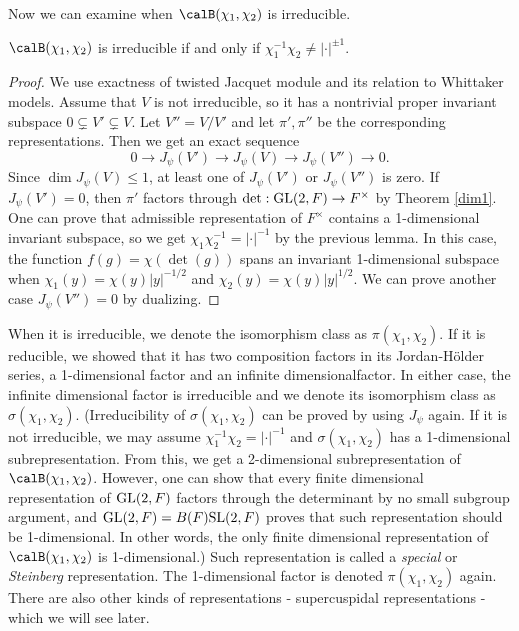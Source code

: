 Now we can examine when $\calB(\chi_1, \chi_2)$ is irreducible. 
\begin{theorem}
$\calB(\chi_1, \chi_2)$ is irreducible if and only if $\chi_1^{-1}\chi_2 \neq  |\cdot|^{\pm 1}$. 
\end{theorem}
\begin{proof}
We use exactness of twisted Jacquet module and its relation to Whittaker models. 
Assume that $V$ is not irreducible, so it has a nontrivial proper invariant subspace $0\subsetneq V'\subsetneq V$. 
Let $V'' = V/V'$ and let $\pi', \pi''$ be the corresponding representations. 
Then we get an exact sequence
$$
0\to J_{\psi}(V') \to J_{\psi}(V) \to J_{\psi}(V'') \to 0. 
$$
Since $\dim J_\psi(V) \leq 1$, at least one of $J_\psi(V')$ or $J_{\psi}(V'')$ is zero. 
If $J_{\psi}(V') = 0$, then $\pi'$ factors through $\det : \mathrm{GL}(2, F) \to F^{\times}$ by Theorem \ref{dim1}. 
One can prove that admissible representation of $F^{\times}$ contains a 1-dimensional invariant subspace, so we get $\chi_1 \chi_2^{-1} = |\cdot|^{-1}$ by the previous lemma. In this case, the function $f(g) = \chi(\det(g))$ spans an invariant 1-dimensional subspace when $\chi_{1}(y) = \chi(y)|y|^{-1/2}$ and $\chi_{2}(y) = \chi(y)|y|^{1/2}$. 
We can prove another case $J_\psi(V'') = 0$ by dualizing. 
\end{proof}
When it is irreducible, we denote the isomorphism class as $\pi(\chi_1, \chi_2)$. If it is reducible, we showed that it has two composition factors in its Jordan-H\"older series, a 1-dimensional factor and an infinite dimensionalfactor. 
In either case, the infinite dimensional factor is irreducible and we denote its isomorphism class as $\sigma(\chi_1, \chi_2)$. 
(Irreducibility of $\sigma(\chi_1, \chi_2)$ can be proved by using $J_{\psi}$ again. If it is not irreducible, we may assume $\chi_{1}^{-1}\chi_{2} = |\cdot |^{-1}$ and $\sigma(\chi_1, \chi_2)$ has a 1-dimensional subrepresentation. 
From this, we get a 2-dimensional subrepresentation of $\calB(\chi_1, \chi_2)$. 
However, one can show that every finite dimensional representation of $\mathrm{GL}(2, F)$ factors through the determinant by no small subgroup argument, and $\mathrm{GL}(2, F) = B(F) \mathrm{SL}(2, F)$ proves that such representation should be 1-dimensional. In other words, the only finite dimensional representation of $\calB(\chi_1, \chi_2)$ is 1-dimensional.)
Such representation is called a \emph{special} or \emph{Steinberg} representation. 
The 1-dimensional factor is denoted $\pi(\chi_1, \chi_2)$ again. There are also other kinds of representations - supercuspidal representations - which we will see later. 

